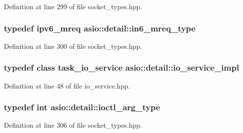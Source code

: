 Definition at line 299 of file socket\+\_\+types.\+hpp.

\hypertarget{namespaceasio_1_1detail_acbb283b0a4fe49399a5c10a0ffa73972}{}
\subsubsection[{in6\+\_\+mreq\+\_\+type}]{\setlength{\rightskip}{0pt plus 5cm}typedef ipv6\+\_\+mreq {\bf asio\+::detail\+::in6\+\_\+mreq\+\_\+type}}\label{namespaceasio_1_1detail_acbb283b0a4fe49399a5c10a0ffa73972}


Definition at line 300 of file socket\+\_\+types.\+hpp.

\hypertarget{namespaceasio_1_1detail_a6d61d9b8e53c11288be549d82aec5a42}{}
\subsubsection[{io\+\_\+service\+\_\+impl}]{\setlength{\rightskip}{0pt plus 5cm}typedef class {\bf task\+\_\+io\+\_\+service} {\bf asio\+::detail\+::io\+\_\+service\+\_\+impl}}\label{namespaceasio_1_1detail_a6d61d9b8e53c11288be549d82aec5a42}


Definition at line 48 of file io\+\_\+service.\+hpp.

\hypertarget{namespaceasio_1_1detail_a27f72e1b8b785eaaa59ddc6b41751106}{}
\subsubsection[{ioctl\+\_\+arg\+\_\+type}]{\setlength{\rightskip}{0pt plus 5cm}typedef int {\bf asio\+::detail\+::ioctl\+\_\+arg\+\_\+type}}\label{namespaceasio_1_1detail_a27f72e1b8b785eaaa59ddc6b41751106}


Definition at line 306 of file socket\+\_\+types.\+hpp.

\hypertarget{namespaceasio_1_1detail_a417cb909eef0654a2e53adc1f4dd2dc1}{}
